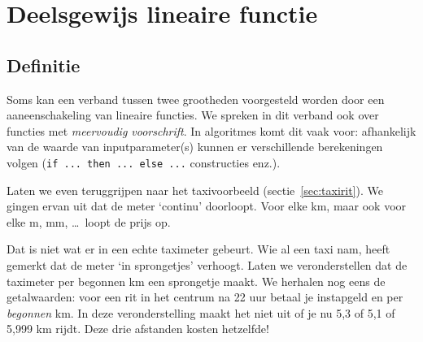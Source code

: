 \section{Deelsgewijs lineaire functie}\label{sec:taxisprong}
\subsection{Definitie}
Soms kan een verband tussen twee grootheden voorgesteld worden door een aaneenschakeling van lineaire functies. We spreken in dit verband ook over functies met \emph{meervoudig voorschrift}. In algoritmes komt dit vaak voor: afhankelijk van de waarde van inputparameter(s) kunnen er verschillende berekeningen volgen (\verb+if ... then ... else ...+ constructies enz.).

Laten we even teruggrijpen naar het taxivoorbeeld (sectie~\ref{sec:taxirit}). We gingen ervan uit dat de meter `continu' doorloopt. Voor elke km, maar ook voor elke m, mm, \ldots \ loopt de prijs op. 

Dat is niet wat er in een echte taximeter gebeurt. Wie al een taxi nam, heeft gemerkt dat de meter `in sprongetjes' verhoogt. Laten we veronderstellen dat de taximeter per begonnen km een sprongetje maakt. We herhalen nog eens de getalwaarden: voor een rit in het centrum na 22 uur betaal je  instapgeld en  per \emph{begonnen} km. In deze veronderstelling maakt het niet uit of je nu 5,3 of 5,1 of 5,999 km rijdt. Deze drie afstanden kosten hetzelfde!

